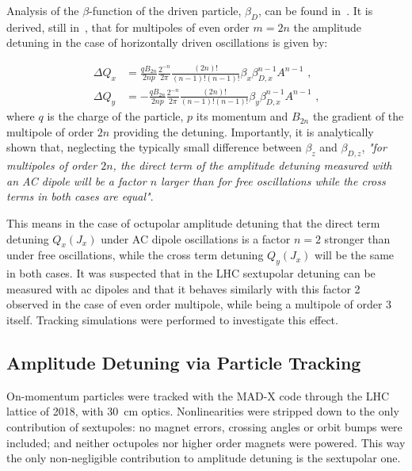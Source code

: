 Analysis of the \(\beta\)-function of the driven particle, \(\beta_D\), can be found in~\cite{PHD:Miyamoto,PRAB:Miyamoto:Parametrization_Driven_Betatron_Oscillation,PRAB:White:Direct_Amplitude_Detuning_AC_Dipole}.
It is derived, still in~\cite{PRAB:White:Direct_Amplitude_Detuning_AC_Dipole}, that for multipoles of even order \(m = 2n\) the amplitude detuning in the case of horizontally driven oscillations is given by:

\begin{equation}
    \begin{aligned}
        \Delta Q_x &= \frac{q B_{2n}}{2np} \frac{2^{-n}}{2 \pi} \frac{(2n)!}{(n-1)! (n-1)!} \beta_x \beta_{D,x}^{n-1} A^{n-1} \text{ ,} \\
        \Delta Q_y &= -\frac{q B_{2n}}{2np} \frac{2^{-n}}{2 \pi} \frac{(2n)!}{(n-1)! (n-1)!} \beta_y \beta_{D,x}^{n-1} A^{n-1} \text{ ,}
    \end{aligned}
    \label{eqn:transverse_amp_det}
\end{equation}
where \(q\) is the charge of the particle, \(p\) its momentum and \(B_{2n}\) the gradient of the multipole of order \(2n\) providing the detuning.
Importantly, it is analytically shown that, neglecting the typically small difference between \(\beta_z\) and \(\beta_{D,z}\), \textit{"for multipoles of order \(2n\), the direct term of the amplitude detuning measured with an AC dipole will be a factor \(n\) larger than for free oscillations while the cross terms in both cases are equal"}.

This means in the case of octupolar amplitude detuning that the direct term detuning \(Q_{x}(J_{x})\) under AC dipole oscillations is a factor \(n = 2\) stronger than under free oscillations, while the cross term detuning \(Q_{y}(J_{x})\) will be the same in both cases.
It was suspected that in the LHC sextupolar detuning can be measured with ac dipoles and that it behaves similarly with this factor \num{2} observed in the case of even order multipole, while being a multipole of order \num{3} itself.
Tracking simulations were performed to investigate this effect.

\subsection*{Amplitude Detuning via Particle Tracking}

On-momentum particles were tracked with the MAD-X code through the LHC lattice of \num{2018}, with \qty{30}{\centi\meter} optics.
Nonlinearities were stripped down to the only contribution of sextupoles: no magnet errors, crossing angles or orbit bumps were included; and neither octupoles nor higher order magnets were powered.
This way the only non-negligible contribution to amplitude detuning is the sextupolar one.


